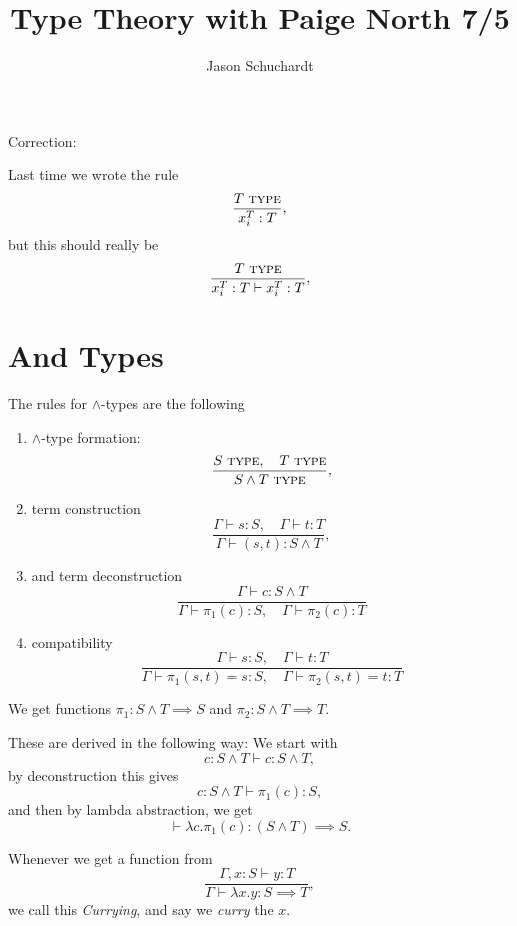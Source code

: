 \documentclass{article}
\title{Type Theory with Paige North 7/5}
\author{Jason Schuchardt}
\newcommand{\yields}{\vdash}
\newcommand\TYPE{\text{ \scshape{type}}}
\theoremstyle{remark}
\begin{document}
\maketitle

Correction:

Last time we wrote the rule
\[
    \frac{T\TYPE}{x_i^T:T},
    \]
but this should really be 
\[
    \frac{T\TYPE}{x_i^T:T\yields x_i^T:T},
    \]

\section{And Types}

\begin{definition}
    The rules for $\wedge$-types are the following
    \begin{enumerate}
    \item $\wedge$-type formation:
    \[
        \frac{S\TYPE,\quad T\TYPE}{S\wedge T \TYPE},
    \]
    \item term construction \[
        \frac{\Gamma \yields s:S, \quad \Gamma\yields t:T}
        {
            \Gamma \yields (s,t) : S\wedge T
        },
    \]
    \item and term deconstruction
        \[ \frac{\Gamma \yields c : S\wedge T}{
            \Gamma\yields \pi_1(c):S,\quad \Gamma\yields \pi_2(c):T
            }
        \]
    \item compatibility
        \[
            \frac{\Gamma\yields s:S,\quad \Gamma \yields t:T}{
                \Gamma \yields \pi_1(s,t) = s :S,\quad
                \Gamma\yields\pi_2(s,t) = t:T
            }
        \]
    \end{enumerate}
\end{definition}

\begin{example}
    We get functions $\pi_1:S\wedge T \implies S$ and 
    $\pi_2 : S\wedge T \implies T$.

    These are derived in the following way:
    We start with 
    \[c:S\wedge T \yields c : S\wedge T,\]
    by deconstruction this gives
    \[c:S\wedge T \yields \pi_1(c):S, \]
    and then by lambda abstraction, we get
    \[ \yields \lambda c.\pi_1(c) : (S\wedge T)\implies S. \]

    Whenever we get a function from
    \[\frac{\Gamma,x:S\yields y:T}{
        \Gamma \yields \lambda x.y : S\implies T},\]
    we call this \emph{Currying}, and say we \emph{curry} the $x$.
\end{example}
\end{document}
